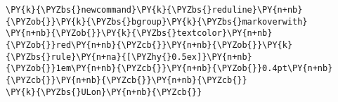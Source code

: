 \begin{Verbatim}[commandchars=\\\{\}]
\PY{k}{\PYZbs{}newcommand}\PY{k}{\PYZbs{}reduline}\PY{n+nb}{\PYZob{}}\PY{k}{\PYZbs{}bgroup}\PY{k}{\PYZbs{}markoverwith}
\PY{n+nb}{\PYZob{}}\PY{k}{\PYZbs{}textcolor}\PY{n+nb}{\PYZob{}}red\PY{n+nb}{\PYZcb{}}\PY{n+nb}{\PYZob{}}\PY{k}{\PYZbs{}rule}\PY{n+na}{[\PYZhy{}0.5ex]}\PY{n+nb}{\PYZob{}}1em\PY{n+nb}{\PYZcb{}}\PY{n+nb}{\PYZob{}}0.4pt\PY{n+nb}{\PYZcb{}}\PY{n+nb}{\PYZcb{}}\PY{n+nb}{\PYZcb{}}
\PY{k}{\PYZbs{}ULon}\PY{n+nb}{\PYZcb{}}
\end{Verbatim}
